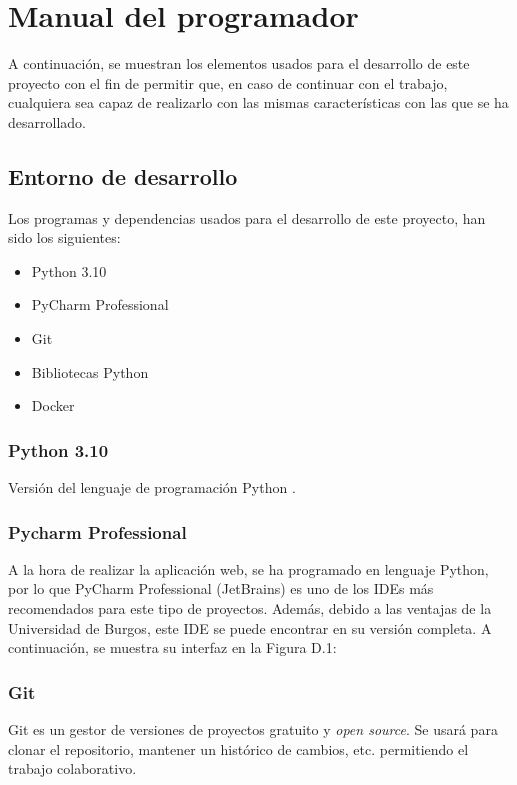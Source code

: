 \section{Manual del programador}
A continuación, se muestran los elementos usados para el desarrollo de este proyecto con el fin de permitir que, en caso de continuar con el trabajo, cualquiera sea capaz de realizarlo con las mismas características con las que se ha desarrollado.

\subsection{Entorno de desarrollo}
Los programas y dependencias usados para el desarrollo de este proyecto, han sido los siguientes:
\begin{itemize}
    \item Python 3.10
    \item PyCharm Professional
    \item Git
    \item Bibliotecas Python
    \item Docker
\end{itemize}

\subsubsection{Python 3.10}
Versión del lenguaje de programación Python \cite{PythonRe2:online}.

\subsubsection{Pycharm Professional}
A la hora de realizar la aplicación web, se ha programado en lenguaje Python, por lo que PyCharm Professional (JetBrains) \cite{PyCharme42:online} es uno de los IDEs más recomendados para este tipo de proyectos.
Además, debido a las ventajas de la Universidad de Burgos, este IDE se puede encontrar en su versión completa.
A continuación, se muestra su interfaz en la Figura D.1:


\subsubsection{Git}
Git es un gestor de versiones de proyectos gratuito y \textit{open source}. Se usará para clonar el repositorio, mantener un histórico de cambios, etc. permitiendo el trabajo colaborativo.


